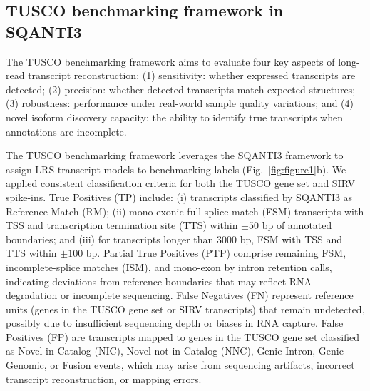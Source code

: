 \documentclass[pdflatex,sn-nature]{sn-jnl}%
\newcommand{\tuscoGeneSet}{TUSCO gene set}
\newcommand{\tuscoBenchmarkingFramework}{TUSCO benchmarking framework}
\begin{document}
\subsection{\tuscoBenchmarkingFramework{} in SQANTI3}

The \tuscoBenchmarkingFramework{} aims to evaluate four key aspects of long-read transcript reconstruction: (1) sensitivity: whether expressed transcripts are detected; (2) precision: whether detected transcripts match expected structures; (3) robustness: performance under real-world sample quality variations; and (4) novel isoform discovery capacity: the ability to identify true transcripts when annotations are incomplete.

The \tuscoBenchmarkingFramework{} leverages the SQANTI3 framework to assign LRS transcript models to benchmarking labels (Fig.~\ref{fig:figure1}b). We applied consistent classification criteria for both the \tuscoGeneSet{} and SIRV spike-ins. True Positives (TP) include: (i) transcripts classified by SQANTI3 as Reference Match (RM); (ii) mono-exonic full splice match (FSM) transcripts with TSS and transcription termination site (TTS) within $\pm 50$ bp of annotated boundaries; and (iii) for transcripts longer than 3000 bp, FSM with TSS and TTS within $\pm 100$ bp. Partial True Positives (PTP) comprise remaining FSM, incomplete-splice matches (ISM), and mono-exon by intron retention calls, indicating deviations from reference boundaries that may reflect RNA degradation or incomplete sequencing. False Negatives (FN) represent reference units (genes in the \tuscoGeneSet{} or SIRV transcripts) that remain undetected, possibly due to insufficient sequencing depth or biases in RNA capture. False Positives (FP) are transcripts mapped to genes in the \tuscoGeneSet{} classified as Novel in Catalog (NIC), Novel not in Catalog (NNC), Genic Intron, Genic Genomic, or Fusion events, which may arise from sequencing artifacts, incorrect transcript reconstruction, or mapping errors.
\end{document}
